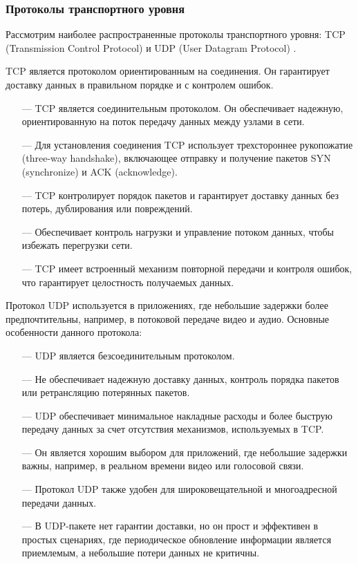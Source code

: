 \subsubsection{Протоколы транспортного уровня}

Рассмотрим наиболее распространенные протоколы транспортного уровня: TCP (Transmission Control Protocol) \cite{TCP} и UDP (User Datagram Protocol) \cite{UDP}.

TCP является протоколом ориентированным на соединения. Он гарантирует доставку данных в правильном порядке и с контролем ошибок.

\begin{itemize}
	\item [---] TCP является соединительным протоколом. Он обеспечивает надежную, ориентированную на поток передачу данных между узлами в сети.
	\item [---] Для установления соединения TCP использует трехстороннее рукопожатие (three-way handshake), включающее отправку и получение пакетов SYN (synchronize) и ACK (acknowledge).
	\item [---] TCP контролирует порядок пакетов и гарантирует доставку данных без потерь, дублирования или повреждений.
	\item [---] Обеспечивает контроль нагрузки и управление потоком данных, чтобы избежать перегрузки сети.
	\item [---] TCP имеет встроенный механизм повторной передачи и контроля ошибок, что гарантирует целостность получаемых данных.
\end{itemize}

Протокол UDP используется в приложениях, где небольшие задержки более предпочтительны, например, в потоковой передаче видео и аудио. Основные особенности данного протокола:

\begin{itemize}
	\item [---] UDP является безсоединительным протоколом.
	\item [---] Не обеспечивает надежную доставку данных, контроль порядка пакетов или ретрансляцию потерянных пакетов.
	\item [---] UDP обеспечивает минимальное накладные расходы и более быструю передачу данных за счет отсутствия механизмов, используемых в TCP.
	\item [---] Он является хорошим выбором для приложений, где небольшие задержки важны, например, в реальном времени видео или голосовой связи.
	\item [---] Протокол UDP также удобен для широковещательной и многоадресной передачи данных.
	\item [---] В UDP-пакете нет гарантии доставки, но он прост и эффективен в простых сценариях, где периодическое обновление информации является приемлемым, а небольшие потери данных не критичны.
\end{itemize}


